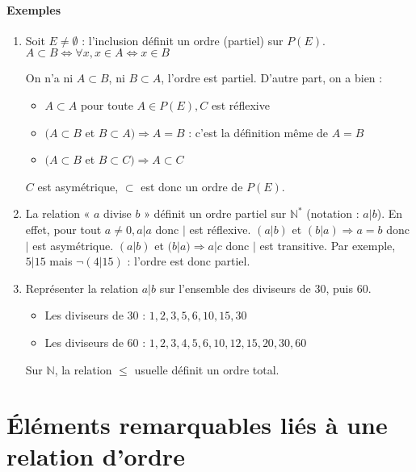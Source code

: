 \documentclass[11pt]{article}
\begin{document}
        \paragraph{Exemples}
            \begin{enumerate}
                \item Soit $E\neq\emptyset$ : l'inclusion définit un ordre (partiel) sur $P(E)$. $A\subset B\Leftrightarrow\forall x,x\in A\Leftrightarrow x\in B$

                On n'a ni $A\subset B$, ni $B\subset A$, l'ordre est partiel. D'autre part, on a bien :
                \begin{itemize}
                    \item $A\subset A$ pour toute $A\in P(E), C$ est réflexive
                    \item $(A\subset B$ et $B\subset A)\Rightarrow A=B$ : c'est la définition même de $A=B$
                    \item $(A\subset B$ et $B\subset C)\Rightarrow A\subset C$
                \end{itemize}

                $C$ est asymétrique, $\subset$ est donc un ordre de $P(E)$.

                \item La relation « $a$ divise $b$ » définit un ordre partiel sur $\mathbb{N}^*$ (notation : $a|b$). En effet, pour tout $a\neq 0, a|a$ donc $|$ est réflexive. $(a|b)$ et $(b|a)\Rightarrow a=b$ donc $|$ est asymétrique. $(a|b)$ et $(b|a)\Rightarrow a|c$ donc $|$ est transitive. Par exemple, $5|15$ mais $\lnot(4|15)$ : l'ordre est donc partiel.
                \item Représenter la relation $a|b$ sur l'ensemble des diviseurs de 30, puis 60.
                    \begin{itemize}
                        \item Les diviseurs de 30 : ${1,2,3,5,6,10,15,30}$
                        \item Les diviseurs de 60 : ${1,2,3,4,5,6,10,12,15,20,30,60}$
                    \end{itemize}

                Sur $\mathbb{N}$, la relation $\leq$ usuelle définit un ordre total.
            \end{enumerate}

    \section{Éléments remarquables liés à une relation d'ordre}
\end{document}

